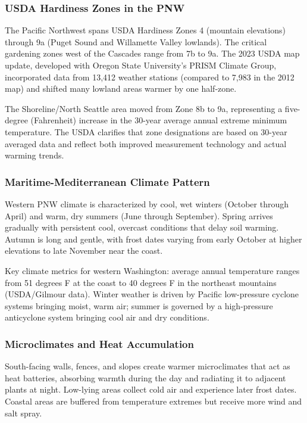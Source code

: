 \documentclass[11pt,letterpaper]{article}
\begin{document}
\subsubsection{USDA Hardiness Zones in the PNW}

The Pacific Northwest spans USDA Hardiness Zones 4 (mountain elevations) through 9a (Puget Sound and Willamette Valley lowlands). The critical gardening zones west of the Cascades range from 7b to 9a. The 2023 USDA map update, developed with Oregon State University's PRISM Climate Group, incorporated data from 13,412 weather stations (compared to 7,983 in the 2012 map) and shifted many lowland areas warmer by one half-zone.

The Shoreline/North Seattle area moved from Zone 8b to 9a, representing a five-degree (Fahrenheit) increase in the 30-year average annual extreme minimum temperature. The USDA clarifies that zone designations are based on 30-year averaged data and reflect both improved measurement technology and actual warming trends.

\subsubsection{Maritime-Mediterranean Climate Pattern}

Western PNW climate is characterized by cool, wet winters (October through April) and warm, dry summers (June through September). Spring arrives gradually with persistent cool, overcast conditions that delay soil warming. Autumn is long and gentle, with frost dates varying from early October at higher elevations to late November near the coast.

Key climate metrics for western Washington: average annual temperature ranges from 51 degrees F at the coast to 40 degrees F in the northeast mountains (USDA/Gilmour data). Winter weather is driven by Pacific low-pressure cyclone systems bringing moist, warm air; summer is governed by a high-pressure anticyclone system bringing cool air and dry conditions.

\subsubsection{Microclimates and Heat Accumulation}

South-facing walls, fences, and slopes create warmer microclimates that act as heat batteries, absorbing warmth during the day and radiating it to adjacent plants at night. Low-lying areas collect cold air and experience later frost dates. Coastal areas are buffered from temperature extremes but receive more wind and salt spray.
\end{document}
